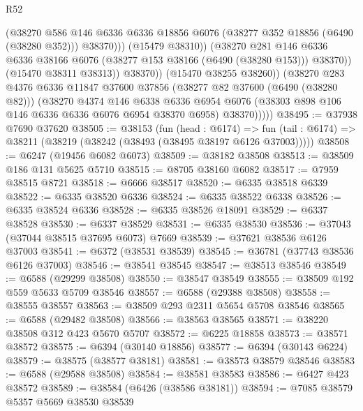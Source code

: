 \begin{lexlean}{R52}
\begin{coremodule}
                          (@38270
                            @586
                            @146
                            @6336
                            @6336
                            @18856
                            @6076
                            (@38277 @352 @18856 (@6490 (@38280 @352)))
                            @38370)))
                      (@15479 @38310))
                    (@38270
                      @281
                      @146
                      @6336
                      @6336
                      @38166
                      @6076
                      (@38277 @153 @38166 (@6490 (@38280 @153)))
                      @38370))
                  (@15470 @38311 @38313))
                @38370))
            (@15470 @38255 @38260))
          (@38270
            @283
            @4376
            @6336
            @11847
            @37600
            @37856
            (@38277 @82 @37600 (@6490 (@38280 @82)))
            (@38270
              @4374
              @146
              @6338
              @6336
              @6954
              @6076
              (@38303 @898 @106 @146 @6336 @6336 @6076 @6954 @38370 @6958)
              @38370)))))
@38495 := @37938 @7690 @37620
@38505 := @38153
    (fun (head : @6174) =>
    fun (tail : @6174) => @38211 (@38219 (@38242 (@38493 (@38495 @38197 @6126 @37003)))))
@38508 := @6247 (@19456 @6082 @6073)
@38509 := @38182 @38508
@38513 := @38509 @186 @131 @5625 @5710
@38515 := @8705 @38160 @6082
@38517 := @7959 @38515 @8721
@38518 := @6666 @38517
@38520 := @6335 @38518 @6339
@38522 := @6335 @38520 @6336
@38524 := @6335 @38522 @6338
@38526 := @6335 @38524 @6336
@38528 := @6335 @38526 @18091
@38529 := @6337 @38528
@38530 := @6337 @38529
@38531 := @6335 @38530
@38536 := @37043 (@37044 @38515 @37695 @6073) @7669
@38539 := @37621 @38536 @6126 @37003
@38541 := @6372 (@38531 @38539)
@38545 := @36781 (@37743 @38536 @6126 @37003)
@38546 := @38541 @38545
@38547 := @38513 @38546
@38549 := @6588 (@29299 @38508)
@38550 := @38547 @38549
@38555 := @38509 @192 @559 @5633 @5709 @38546
@38557 := @6588 (@29388 @38508)
@38558 := @38555 @38557
@38563 := @38509 @293 @2311 @5654 @5708 @38546
@38565 := @6588 (@29482 @38508)
@38566 := @38563 @38565
@38571 := @38220 @38508 @312 @423 @5670 @5707
@38572 := @6225 @18858
@38573 := @38571 @38572
@38575 := @6394 (@30140 @18856)
@38577 := @6394 (@30143 @6224)
@38579 := @38575 (@38577 @38181)
@38581 := @38573 @38579 @38546
@38583 := @6588 (@29588 @38508)
@38584 := @38581 @38583
@38586 := @6427 @423 @38572
@38589 := @38584 (@6426 (@38586 @38181))
@38594 := @7085 @38579 @5357 @5669 @38530 @38539

\end{coremodule}
\end{lexlean}
